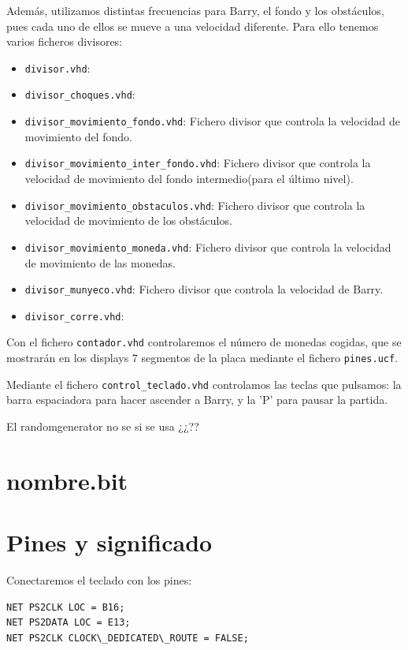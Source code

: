 \documentclass[11pt, a4paper, spanish, openright, twoside]{book}
\begin{document}
Además, utilizamos distintas frecuencias para Barry, el fondo y los obstáculos, pues cada uno de ellos se mueve a una velocidad diferente. Para ello tenemos varios ficheros divisores:

\begin{itemize}

	\item \texttt{divisor.vhd}: 
	\item \texttt{divisor\_choques.vhd}: 
	\item \texttt{divisor\_movimiento\_fondo.vhd}: Fichero divisor que controla la velocidad de movimiento del fondo.
	\item \texttt{divisor\_movimiento\_inter\_fondo.vhd}: Fichero divisor que controla la velocidad de movimiento del fondo intermedio(para el último nivel).
	\item \texttt{divisor\_movimiento\_obstaculos.vhd}: Fichero divisor que controla la velocidad de movimiento de los obstáculos.
	\item \texttt{divisor\_movimiento\_moneda.vhd}: Fichero divisor que controla la velocidad de movimiento de las monedas.
	\item \texttt{divisor\_munyeco.vhd}: Fichero divisor que controla la velocidad de Barry.
	\item \texttt{divisor\_corre.vhd}: 

\end{itemize}

Con el fichero \texttt{contador.vhd} controlaremos el número de monedas cogidas, que se mostrarán en los displays 7 segmentos de la placa mediante el fichero \texttt{pines.ucf}.

Mediante el fichero \texttt{control\_teclado.vhd} controlamos las teclas que pulsamos: la barra espaciadora para hacer ascender a Barry, y la 'P' para pausar la partida.


El randomgenerator no se si se usa ¿¿??


\section{nombre.bit}






\section{Pines y significado}
Conectaremos el teclado con los pines:

\begin{lstlisting}
NET PS2CLK LOC = B16;
NET PS2DATA LOC = E13;
NET PS2CLK CLOCK\_DEDICATED\_ROUTE = FALSE;
\end{lstlisting}
\end{document}
